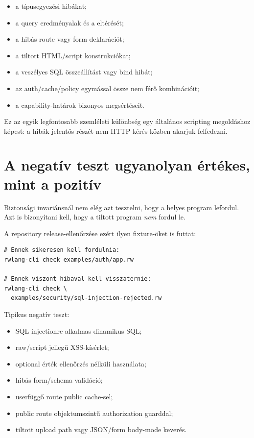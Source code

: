 \begin{itemize}
  \item a típusegyezési hibákat;
  \item a query eredményalak és a  eltérését;
  \item a hibás route vagy form deklarációt;
  \item a tiltott HTML/script konstrukciókat;
  \item a veszélyes SQL összeállítást vagy bind hibát;
  \item az auth/cache/policy egymással össze nem férő kombinációit;
  \item a capability-határok bizonyos megsértéseit.
\end{itemize}

Ez az egyik legfontosabb szemléleti különbség egy általános scripting megoldáshoz képest: a hibák jelentős részét nem HTTP kérés közben akarjuk felfedezni.

\section{A negatív teszt ugyanolyan értékes, mint a pozitív}

Biztonsági invariánsnál nem elég azt tesztelni, hogy a helyes program lefordul. Azt is bizonyítani kell, hogy a tiltott program \emph{nem} fordul le.

A repository release-ellenőrzése ezért ilyen fixture-öket is futtat:

\begin{lstlisting}
# Ennek sikeresen kell fordulnia:
rwlang-cli check examples/auth/app.rw

# Ennek viszont hibaval kell visszaternie:
rwlang-cli check \
  examples/security/sql-injection-rejected.rw
\end{lstlisting}

Tipikus negatív teszt:

\begin{itemize}
  \item SQL injectionre alkalmas dinamikus SQL;
  \item raw/script jellegű XSS-kísérlet;
  \item optional érték ellenőrzés nélküli használata;
  \item hibás form/schema validáció;
  \item userfüggő route public cache-sel;
  \item public route objektumszintű authorization guarddal;
  \item tiltott upload path vagy JSON/form body-mode keverés.
\end{itemize}

